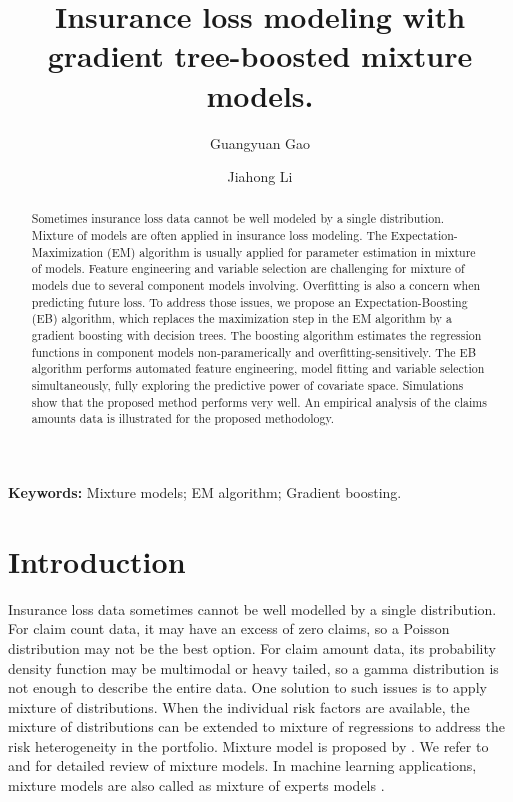 \documentclass[11pt]{article}
\title{Insurance loss modeling with gradient tree-boosted mixture models.}
\author{Guangyuan Gao \and Jiahong Li}
\numberwithin{equation}{section}
\begin{document}
\maketitle

\begin{abstract}
Sometimes insurance loss data cannot be well modeled by a single distribution. Mixture of models are often applied in insurance loss modeling. 
The Expectation-Maximization (EM) algorithm is usually applied for parameter estimation in mixture of models. 
Feature engineering and variable selection are challenging for mixture of models due to several component models involving. 
Overfitting is also a concern when predicting future loss. 
To address those issues, we propose an Expectation-Boosting (EB) algorithm, 
which replaces the maximization step in the EM algorithm by a gradient boosting with decision trees. 
The boosting algorithm estimates the regression functions in component models non-paramerically and overfitting-sensitively. 
The EB algorithm performs automated feature engineering, model fitting and variable selection simultaneously, 
fully exploring the predictive power of covariate space.
Simulations show that the proposed method performs very well.
An empirical analysis of the claims amounts data is illustrated for the proposed methodology. 

\end{abstract}

{\bf Keywords:} Mixture models; EM algorithm; Gradient boosting.


\section{Introduction}

Insurance loss data sometimes cannot be well modelled by a single distribution.
For claim count data, it may have an excess of zero claims, so a Poisson distribution may not be the best option.
For claim amount data, its probability density function may be multimodal or heavy tailed, so a gamma distribution is not enough to describe the entire data.
One solution to such issues is to apply mixture of distributions.
When the individual risk factors are available, the mixture of distributions can be extended to mixture of regressions to address the risk heterogeneity in the portfolio.
Mixture model is proposed by \citet{goldfeld1973markov}.
We refer to \citet{lindsay1995mixture} and \citet{peel2000finite} for detailed review of mixture models.
In machine learning applications, mixture models are also called as mixture of experts models \citep{jacobs1991adaptive,jiang1999hierarchical}.
\end{document}

